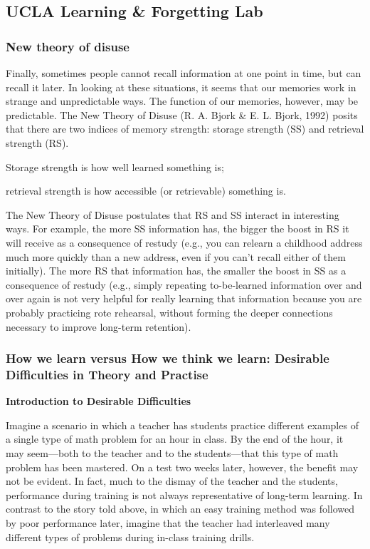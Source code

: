 \subsection{UCLA Learning \& Forgetting Lab}

\subsubsection{New theory of disuse}
Finally, sometimes people cannot recall information at one point in time, but can recall it later. In looking at these situations, it seems that our memories work in strange and unpredictable ways. The function of our memories, however, may be predictable. The New Theory of Disuse (R. A. Bjork \& E. L. Bjork, 1992) posits that there are two indices of memory strength: storage strength (SS) and retrieval strength (RS).

Storage strength is how well learned something is;

retrieval strength is how accessible (or retrievable) something is.

The New Theory of Disuse postulates that RS and SS interact in interesting ways. For example, the more SS information has, the bigger the boost in RS it will receive as a consequence of restudy (e.g., you can relearn a childhood address much more quickly than a new address, even if you can't recall either of them initially). The more RS that information has, the smaller the boost in SS as a consequence of restudy (e.g., simply repeating to-be-learned information over and over again is not very helpful for really learning that information because you are probably practicing rote rehearsal, without forming the deeper connections necessary to improve long-term retention).

\subsubsection{How we learn versus How we think we learn: Desirable Difficulties in Theory and Practise}

\textbf{Introduction to Desirable Difficulties}

Imagine a scenario in which a teacher has students practice different examples of a single type of math problem for an hour in class. By the end of the hour, it may seem—both to the teacher and to the students—that this type of math problem has been mastered. On a test two weeks later, however, the benefit may not be evident. In fact, much to the dismay of the teacher and the students, performance during training is not always representative of long-term learning. In contrast to the story told above, in which an easy training method was followed by poor performance later, imagine that the teacher had interleaved many different types of problems during in-class training drills.

